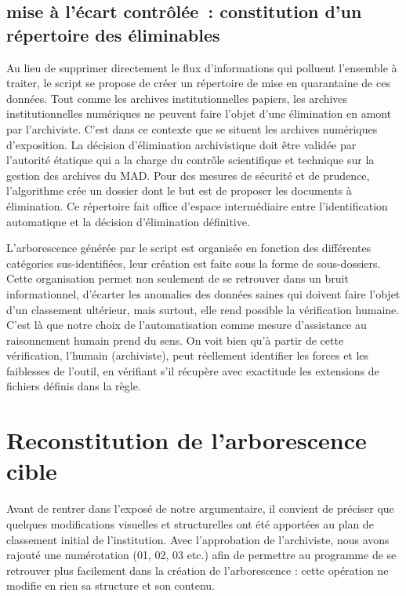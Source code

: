 \subsection*{mise à l’écart contrôlée : constitution d’un répertoire des éliminables}

Au lieu de supprimer directement le flux d'informations qui polluent l'ensemble à traiter, le script se propose de créer un répertoire de mise en quarantaine de ces données. 
Tout comme les archives institutionnelles papiers, les archives institutionnelles numériques ne peuvent faire l'objet d'une élimination en amont par l'archiviste. C'est dans ce contexte que se situent les archives numériques d'exposition. La décision d'élimination archivistique doit être validée par l'autorité étatique qui a la charge du contrôle scientifique et technique sur la gestion des archives du MAD. Pour des mesures de sécurité et de prudence, l'algorithme crée un dossier dont le but est de proposer les documents à élimination. Ce répertoire fait office d'espace intermédiaire entre l'identification automatique et la décision d'élimination définitive.

L'arborescence générée par le script est organisée en fonction des différentes catégories sus-identifiées, leur création est faite sous la forme de sous-dossiers. Cette organisation permet non seulement de se retrouver dans un bruit informationnel, d'écarter les anomalies des données saines qui doivent faire l'objet d'un classement ultérieur, mais surtout, elle rend possible la vérification humaine. C'est là que notre choix de l'automatisation comme mesure d'assistance au raisonnement humain prend du sens. On voit bien qu'à partir de cette vérification, l'humain (archiviste), peut réellement identifier les forces et les faiblesses de l'outil, en vérifiant s'il récupère avec exactitude les extensions de fichiers définis dans la règle.


\section{Reconstitution de l’arborescence cible}

Avant de rentrer dans l'exposé de notre argumentaire, il convient de préciser que quelques modifications visuelles et structurelles ont été apportées au plan de classement initial de l'institution. Avec l'approbation de l'archiviste, nous avons rajouté une numérotation (01, 02, 03 etc.) afin de permettre au programme de se retrouver plus facilement dans la création de l'arborescence : cette opération ne modifie en rien sa structure et son contenu. 

